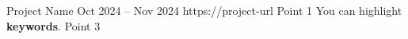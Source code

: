 \resumeProject
{Project Name}
{}
{Oct 2024 -- Nov 2024}
{https://project-url}
\vspace{0.5mm}
\resumeItemListStart
\point Point 1
\point You can highlight \textbf{keywords}.
\point Point 3
\resumeItemListEnd


